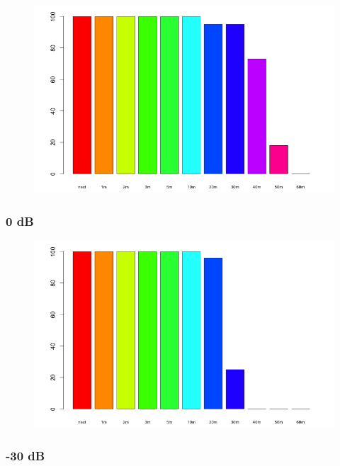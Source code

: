 \begin{figure}[H]
  \centering
  \includegraphics[width=1.0\textwidth]{img/tests/range/db_12.png}
\end{figure}


\subsubsection{0 dB}

\begin{figure}[H]
  \centering
  \includegraphics[width=1.0\textwidth]{img/tests/range/db_00.png}
\end{figure}

\subsubsection{-30 dB}

